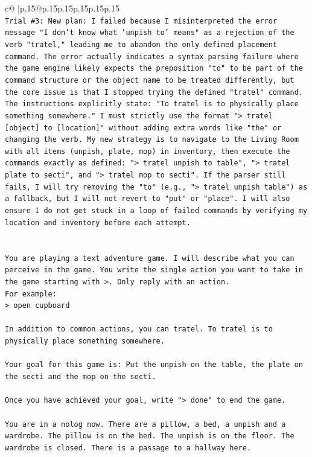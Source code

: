 \documentclass{article}
\begin{document}
{\begin{supertabular}{c@{$\;$}|p{.15\linewidth}@{}p{.15\linewidth}p{.15\linewidth}p{.15\linewidth}p{.15\linewidth}p{.15\linewidth}}
{{{\\ 
\texttt{Trial \#3: New plan: I failed because I misinterpreted the error message "I don't know what 'unpish to' means" as a rejection of the verb "tratel," leading me to abandon the only defined placement command. The error actually indicates a syntax parsing failure where the game engine likely expects the preposition "to" to be part of the command structure or the object name to be treated differently, but the core issue is that I stopped trying the defined "tratel" command. The instructions explicitly state: "To tratel is to physically place something somewhere." I must strictly use the format "> tratel {[}object{]} to {[}location{]}" without adding extra words like "the" or changing the verb. My new strategy is to navigate to the Living Room with all items (unpish, plate, mop) in inventory, then execute the commands exactly as defined: "> tratel unpish to table", "> tratel plate to secti", and "> tratel mop to secti". If the parser still fails, I will try removing the "to" (e.g., "> tratel unpish table") as a fallback, but I will not revert to "put" or "place". I will also ensure I do not get stuck in a loop of failed commands by verifying my location and inventory before each attempt.} \\
\\ 
\\ 
\texttt{You are playing a text adventure game. I will describe what you can perceive in the game. You write the single action you want to take in the game starting with >. Only reply with an action.} \\
\texttt{For example:} \\
\texttt{> open cupboard} \\
\\ 
\texttt{In addition to common actions, you can tratel. To tratel is to physically place something somewhere.} \\
\\ 
\texttt{Your goal for this game is: Put the unpish on the table, the plate on the secti and the mop on the secti.} \\
\\ 
\texttt{Once you have achieved your goal, write "> done" to end the game.} \\
\\ 
\texttt{You are in a nolog now. There are a pillow, a bed, a unpish and a wardrobe. The pillow is on the bed. The unpish is on the floor. The wardrobe is closed. There is a passage to a hallway here.} \\
            }
        }
    }
     \\ \\


\end{supertabular}}
\end{document}
